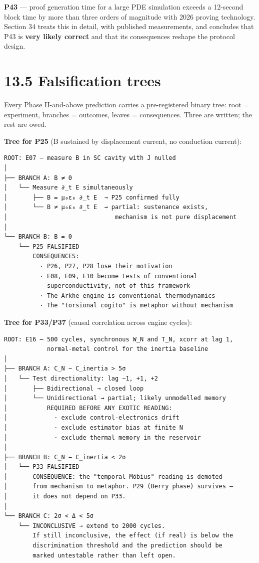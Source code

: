 \documentclass[
  11pt]{report}
\begin{document}
\textbf{P43} --- proof generation time for a large PDE simulation
exceeds a 12-second block time by more than three orders of magnitude
with 2026 proving technology. Section 34 treats this in detail, with
published measurements, and concludes that P43 is \textbf{very likely
correct} and that its consequences reshape the protocol design.

\hypertarget{falsification-trees}{%
\section{13.5 Falsification trees}\label{falsification-trees}}

Every Phase II-and-above prediction carries a pre-registered binary
tree: root = experiment, branches = outcomes, leaves = consequences.
Three are written; the rest are owed.

\textbf{Tree for P25} (B sustained by displacement current, no
conduction current):

\begin{verbatim}
ROOT: E07 — measure B in SC cavity with J nulled
│
├── BRANCH A: B ≠ 0
│   └── Measure ∂_t E simultaneously
│       ├── B = μ₀ε₀ ∂_t E  → P25 confirmed fully
│       └── B ≠ μ₀ε₀ ∂_t E  → partial: sustenance exists,
│                              mechanism is not pure displacement
│
└── BRANCH B: B = 0
    └── P25 FALSIFIED
        CONSEQUENCES:
          · P26, P27, P28 lose their motivation
          · E08, E09, E10 become tests of conventional
            superconductivity, not of this framework
          · The Arkhe engine is conventional thermodynamics
          · The "torsional cogito" is metaphor without mechanism
\end{verbatim}

\textbf{Tree for P33/P37} (causal correlation across engine cycles):

\begin{verbatim}
ROOT: E16 — 500 cycles, synchronous W_N and T_N, xcorr at lag 1,
            normal-metal control for the inertia baseline
│
├── BRANCH A: C_N − C_inertia > 5σ
│   └── Test directionality: lag −1, +1, +2
│       ├── Bidirectional → closed loop
│       └── Unidirectional → partial; likely unmodelled memory
│           REQUIRED BEFORE ANY EXOTIC READING:
│             · exclude control-electronics drift
│             · exclude estimator bias at finite N
│             · exclude thermal memory in the reservoir
│
├── BRANCH B: C_N − C_inertia < 2σ
│   └── P33 FALSIFIED
│       CONSEQUENCE: the "temporal Möbius" reading is demoted
│       from mechanism to metaphor. P29 (Berry phase) survives —
│       it does not depend on P33.
│
└── BRANCH C: 2σ < Δ < 5σ
    └── INCONCLUSIVE → extend to 2000 cycles.
        If still inconclusive, the effect (if real) is below the
        discrimination threshold and the prediction should be
        marked untestable rather than left open.
\end{verbatim}
\end{document}
